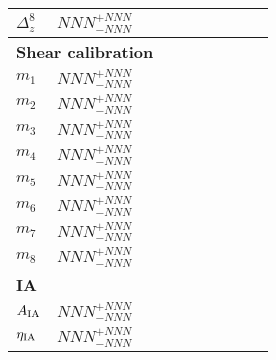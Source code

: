 \documentclass{article}
\begin{document}
\begin{table}
\begin{tabular}{l l l l l l l l l l}
$\Delta_{z}^8$ & $NNN^{+NNN}_{-NNN}$ & & & & & & & & \\
\hline
\multicolumn{10}{l}{\textbf{Shear calibration}}\\
$m_1 $ & $NNN^{+NNN}_{-NNN}$ & & & & & & & & \\
$m_2 $ & $NNN^{+NNN}_{-NNN}$ & & & & & & & & \\
$m_3 $ & $NNN^{+NNN}_{-NNN}$ & & & & & & & & \\
$m_4 $ & $NNN^{+NNN}_{-NNN}$ & & & & & & & & \\
$m_5 $ & $NNN^{+NNN}_{-NNN}$ & & & & & & & & \\
$m_6 $ & $NNN^{+NNN}_{-NNN}$ & & & & & & & & \\
$m_7 $ & $NNN^{+NNN}_{-NNN}$ & & & & & & & & \\
$m_8 $ & $NNN^{+NNN}_{-NNN}$ & & & & & & & & \\
\hline
\multicolumn{10}{l}{\textbf{IA}} \\
    $A_{\rm IA}$ & $NNN^{+NNN}_{-NNN}$ & & & & & & & &\\
    $\eta_{\rm IA}$ & $NNN^{+NNN}_{-NNN}$ & & & & & & & &\\
    \hline
\hline\hline
\end{tabular}
\end{table}
\end{document}
